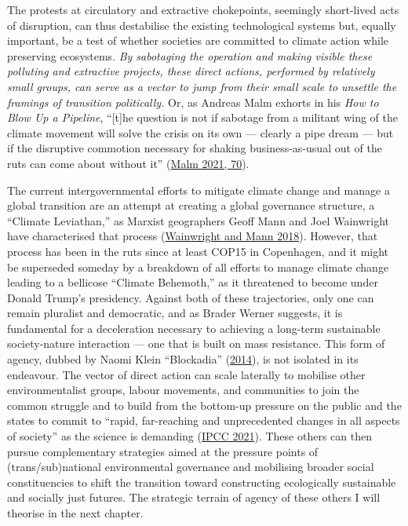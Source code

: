 \documentclass[a4paper, nobind]{templates/ociamthesis}
\begin{document}
The protests at circulatory and extractive chokepoints, seemingly short-lived acts of disruption, can thus destabilise the existing technological systems but, equally important, be a test of whether societies are committed to climate action while preserving ecosystems. \emph{By sabotaging the operation and making visible these polluting and extractive projects, these direct actions, performed by relatively small groups, can serve as a vector to jump from their small scale to unsettle the framings of transition politically.} Or, as Andreas Malm exhorts in his \emph{How to Blow Up a Pipeline}, ``{[}t{]}he question is not if sabotage from a militant wing of the climate movement will solve the crisis on its own --- clearly a pipe dream --- but if the disruptive commotion necessary for shaking business-as-usual out of the ruts can come about without it'' (\protect\hyperlink{ref-malm_how_2021}{Malm 2021, 70}).

The current intergovernmental efforts to mitigate climate change and manage a global transition are an attempt at creating a global governance structure, a ``Climate Leviathan,'' as Marxist geographers Geoff Mann and Joel Wainwright have characterised that process (\protect\hyperlink{ref-wainwright_climate_2018}{Wainwright and Mann 2018}). However, that process has been in the ruts since at least COP15 in Copenhagen, and it might be superseded someday by a breakdown of all efforts to manage climate change leading to a bellicose ``Climate Behemoth,'' as it threatened to become under Donald Trump's presidency. Against both of these trajectories, only one can remain pluralist and democratic, and as Brader Werner suggests, it is fundamental for a deceleration necessary to achieving a long-term sustainable society-nature interaction --- one that is built on mass resistance. This form of agency, dubbed by Naomi Klein ``Blockadia'' (\protect\hyperlink{ref-klein_this_2014}{2014}), is not isolated in its endeavour. The vector of direct action can scale laterally to mobilise other environmentalist groups, labour movements, and communities to join the common struggle and to build from the bottom-up pressure on the public and the states to commit to ``rapid, far-reaching and unprecedented changes in all aspects of society'' as the science is demanding (\protect\hyperlink{ref-ipcc_summary_2021}{IPCC 2021}). These others can then pursue complementary strategies aimed at the pressure points of (trans/sub)national environmental governance and mobilising broader social constituencies to shift the transition toward constructing ecologically sustainable and socially just futures. The strategic terrain of agency of these others I will theorise in the next chapter.
\end{document}
